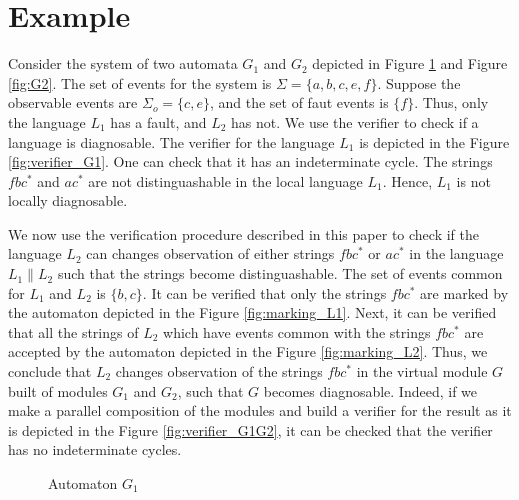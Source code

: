 \documentclass[a4paper, 10pt, conference]{ieeeconf}
\begin{document}
\section{Example}
\label{sec:Example}

Consider the system of two automata $G_1$ and $G_2$ depicted in Figure
\ref{fig:G1} and Figure \ref{fig:G2}. The set of events for the system is
$\Sigma = \{a, b, c, e, f\}$. Suppose the observable events are $\Sigma_o = \{c,
e\}$, and the set of faut events is $\{f\}$. Thus, only the language $L_1$ has a
fault, and $L_2$ has not. We use the verifier \cite{yoo_polynomial-time_2002} to
check if a language is diagnosable. The verifier for the language $L_1$ is
depicted in the Figure \ref{fig:verifier_G1}. One can check that it has an
indeterminate cycle.
The strings $fbc^*$ and $ac^*$ are not distinguashable in the local language
$L_1$. Hence, $L_1$ is not locally diagnosable.

We now use the verification procedure described in this paper to check if the
language $L_2$ can changes observation of either strings $fbc^*$ or
$ac^*$ in the language $L_1 \parallel L_2$ such that the strings become
distinguashable. The set of events common for $L_1$ and $L_2$ is $\{b, c\}$. It
can be verified that only the strings $fbc^*$ are marked by the automaton
depicted in the Figure \ref{fig:marking_L1}. Next, it can be verified that all
the strings of $L_2$ which have events common with the strings $fbc^*$ are
accepted by the automaton depicted in the Figure \ref{fig:marking_L2}. Thus, we
conclude that $L_2$ changes observation of the strings $fbc^*$ in the virtual
module $G$ built of modules $G_1$ and $G_2$, such that $G$ becomes diagnosable.
Indeed, if we make a parallel composition of the modules and build a verifier
for the result as it is depicted in the Figure \ref{fig:verifier_G1G2}, it can
be checked that the verifier has no indeterminate cycles.

\begin{figure}[t]
\centering
{}
\caption{Automaton $G_1$}
\label{fig:G1}
\end{figure}
\end{document}
